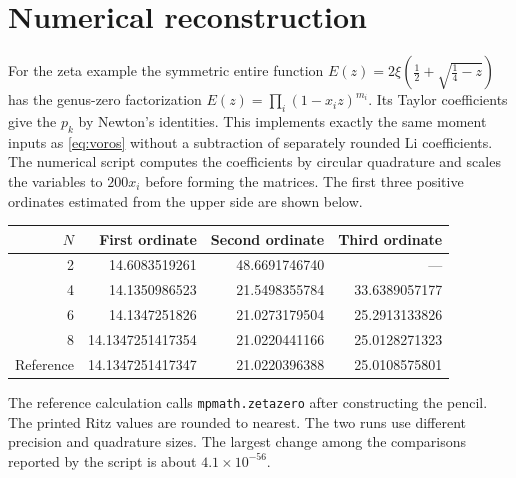 \documentclass[11pt]{article}
\begin{document}
\section{Numerical reconstruction}
For the zeta example the symmetric entire function
$E(z)=2\xi(\tfrac12+\sqrt{\tfrac14-z})$ has the genus-zero factorization
$E(z)=\prod_i(1-x_i z)^{m_i}$. Its Taylor coefficients give the $p_k$ by Newton's identities. This implements exactly the same moment inputs as \eqref{eq:voros} without a subtraction of separately rounded Li coefficients. The numerical script computes the coefficients by circular quadrature and scales the variables to $200x_i$ before forming the matrices. The first three positive ordinates estimated from the upper side are shown below.
\begin{center}
\begin{tabular}{rrrr}
\toprule
$N$ & First ordinate & Second ordinate & Third ordinate\\
\midrule
2 & 14.6083519261 & 48.6691746740 & ---\\
4 & 14.1350986523 & 21.5498355784 & 33.6389057177\\
6 & 14.1347251826 & 21.0273179504 & 25.2913133826\\
8 & 14.1347251417354 & 21.0220441166 & 25.0128271323\\
\midrule
Reference & 14.1347251417347 & 21.0220396388 & 25.0108575801\\
\bottomrule
\end{tabular}
\end{center}
The reference calculation calls \texttt{mpmath.zetazero} after constructing the pencil. The printed Ritz values are rounded to nearest. The two runs use different precision and quadrature sizes. The largest change among the comparisons reported by the script is about $4.1\times10^{-56}$.
\end{document}
